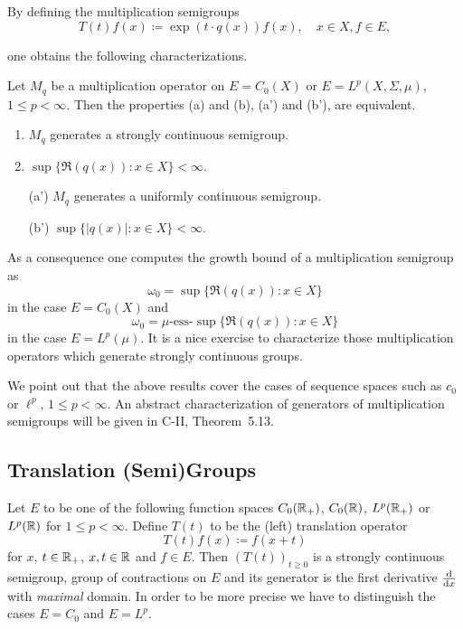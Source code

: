 By defining the multiplication semigroups
\[
    T(t)f(x) \coloneqq \exp(t \cdot q(x))f(x), \quad x \in X, f \in E,
\]

one obtains the following characterizations.
\begin{proposition*}\label{prop:a1-2.3}
Let $M_{q}$ be a multiplication operator on $E = C_{0}(X)$ or $E = L^{p}(X,\Sigma,\mu)$, $1 \leq p < \infty$.
Then the properties (a) and (b), \resp (a') and (b'), are equivalent.
\begin{enumerate}[\upshape (a)]
\item 
	$M_{q}$ generates a strongly continuous semigroup.

\item 
	$\sup\{\Re( q(x)) \colon x \in X \} < \infty$.

\item[\upshape (a')] 
	$M_{q}$ generates a uniformly continuous semigroup.

\item[(b')] 
	$\sup\{|q(x)| \colon x \in X \} < \infty$.
\end{enumerate}
\end{proposition*}
As a consequence one computes the growth bound of a multiplication semigroup as
\[
    \omega_{0} = \sup\{\Re(q(x)) \colon x \in X\} 
\]
in the case $E = C_{0}(X)$ and 
\[
    \omega_{0} = \mu\text{-ess-}\sup\{\Re(q(x)) \colon x \in X\} 
\]
in the case  $E = L^{p}(\mu)$.
It is a nice exercise to characterize those multiplication operators which generate strongly continuous groups.

We point out that the above results cover the cases of sequence spaces such as $c_{0}$ or $\ell^{p}$, $1 \leq p < \infty$.
An abstract characterization of generators of multiplication semigroups will be given in C-II, Theorem~5.13.
\subsection{Translation (Semi)Groups}\label{subsec:a1-2.4}%
Let $E$ to be one of the following function spaces $C_{0}(\mathbb{R}_{+})$, $C_{0}(\mathbb{R})$, $L^{p}(\mathbb{R}_{+})$ or $L^{p}(\mathbb{R})$ for $1 \leq p < \infty$.
Define $T(t)$ to be the (left) translation operator
\[
    T(t)f(x) \coloneqq f(x+t)
\]
for $x$, $ t \in \mathbb{R}_{+}$, \resp $x, t \in \mathbb{R}$ and $f \in E$.
Then $(T(t))_{t \geq 0}$ is a strongly continuous semigroup, \resp group of contractions on $E$ and its generator is the first derivative $\frac{\mathop{}\!\mathrm{d}{}}{\mathop{}\!\mathrm{d}{x}}$ with \emph{maximal} domain.
In order to be more precise we have to distinguish the cases $E = C_{0}$ and $E = L^{p}$.

